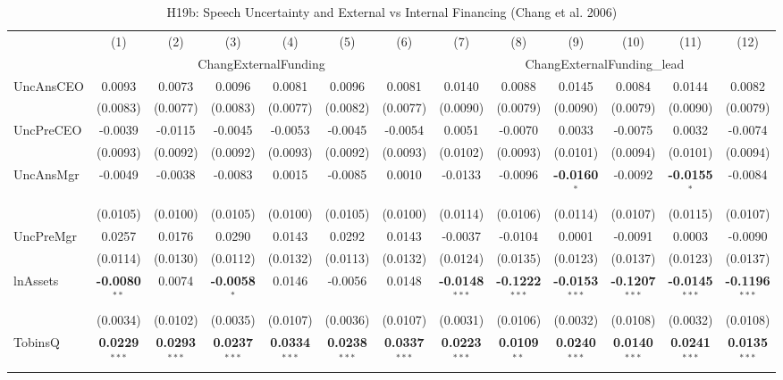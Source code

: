 \documentclass[11pt,a4paper]{article}
\begin{document}
\begin{table}[htbp]
\centering
\caption{H19b: Speech Uncertainty and External vs Internal Financing (Chang et al. 2006)}
\label{tab:h19b}
\scriptsize
\begin{tabular}{lcccccccccccc}
\toprule
 & (1) & (2) & (3) & (4) & (5) & (6) & (7) & (8) & (9) & (10) & (11) & (12) \\
 & \multicolumn{6}{c}{ChangExternalFunding} & \multicolumn{6}{c}{ChangExternalFunding\_lead} \\
\cmidrule(lr){2-7} \cmidrule(lr){8-13}
\midrule
UncAnsCEO & 0.0093 & 0.0073 & 0.0096 & 0.0081 & 0.0096 & 0.0081 & 0.0140 & 0.0088 & 0.0145 & 0.0084 & 0.0144 & 0.0082 \\
 & (0.0083) & (0.0077) & (0.0083) & (0.0077) & (0.0082) & (0.0077) & (0.0090) & (0.0079) & (0.0090) & (0.0079) & (0.0090) & (0.0079) \\
UncPreCEO & -0.0039 & -0.0115 & -0.0045 & -0.0053 & -0.0045 & -0.0054 & 0.0051 & -0.0070 & 0.0033 & -0.0075 & 0.0032 & -0.0074 \\
 & (0.0093) & (0.0092) & (0.0092) & (0.0093) & (0.0092) & (0.0093) & (0.0102) & (0.0093) & (0.0101) & (0.0094) & (0.0101) & (0.0094) \\
UncAnsMgr & -0.0049 & -0.0038 & -0.0083 & 0.0015 & -0.0085 & 0.0010 & -0.0133 & -0.0096 & \textbf{-0.0160}$^{*}$ & -0.0092 & \textbf{-0.0155}$^{*}$ & -0.0084 \\
 & (0.0105) & (0.0100) & (0.0105) & (0.0100) & (0.0105) & (0.0100) & (0.0114) & (0.0106) & (0.0114) & (0.0107) & (0.0115) & (0.0107) \\
UncPreMgr & 0.0257 & 0.0176 & 0.0290 & 0.0143 & 0.0292 & 0.0143 & -0.0037 & -0.0104 & 0.0001 & -0.0091 & 0.0003 & -0.0090 \\
 & (0.0114) & (0.0130) & (0.0112) & (0.0132) & (0.0113) & (0.0132) & (0.0124) & (0.0135) & (0.0123) & (0.0137) & (0.0123) & (0.0137) \\
\midrule
lnAssets & \textbf{-0.0080}$^{**}$ & 0.0074 & \textbf{-0.0058}$^{*}$ & 0.0146 & -0.0056 & 0.0148 & \textbf{-0.0148}$^{***}$ & \textbf{-0.1222}$^{***}$ & \textbf{-0.0153}$^{***}$ & \textbf{-0.1207}$^{***}$ & \textbf{-0.0145}$^{***}$ & \textbf{-0.1196}$^{***}$ \\
 & (0.0034) & (0.0102) & (0.0035) & (0.0107) & (0.0036) & (0.0107) & (0.0031) & (0.0106) & (0.0032) & (0.0108) & (0.0032) & (0.0108) \\
TobinsQ & \textbf{0.0229}$^{***}$ & \textbf{0.0293}$^{***}$ & \textbf{0.0237}$^{***}$ & \textbf{0.0334}$^{***}$ & \textbf{0.0238}$^{***}$ & \textbf{0.0337}$^{***}$ & \textbf{0.0223}$^{***}$ & \textbf{0.0109}$^{**}$ & \textbf{0.0240}$^{***}$ & \textbf{0.0140}$^{***}$ & \textbf{0.0241}$^{***}$ & \textbf{0.0135}$^{***}$ \\

\end{tabular}
\end{table}
\end{document}
